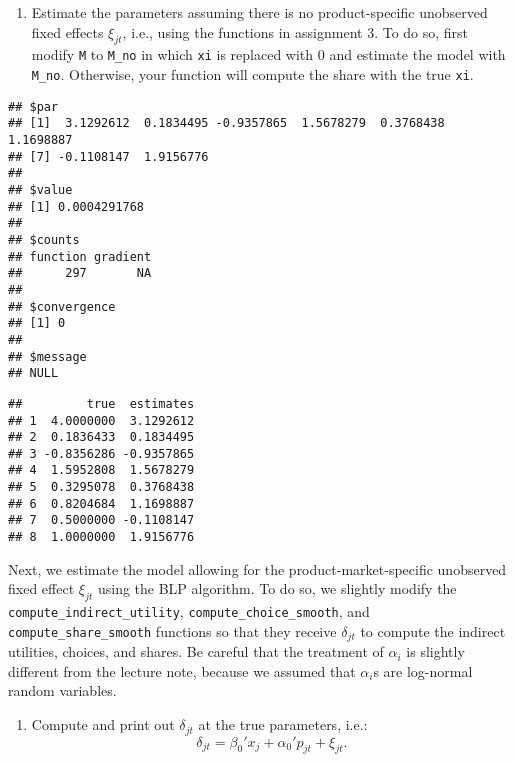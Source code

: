 \documentclass[
]{book}
\newenvironment{Shaded}{\begin{snugshade}}{\end{snugshade}}
\newcommand{\DataTypeTok}[1]{\textcolor[rgb]{0.13,0.29,0.53}{#1}}
\newcommand{\DecValTok}[1]{\textcolor[rgb]{0.00,0.00,0.81}{#1}}
\newcommand{\KeywordTok}[1]{\textcolor[rgb]{0.13,0.29,0.53}{\textbf{#1}}}
\newcommand{\NormalTok}[1]{#1}
\newcommand{\OperatorTok}[1]{\textcolor[rgb]{0.81,0.36,0.00}{\textbf{#1}}}
\newcommand{\StringTok}[1]{\textcolor[rgb]{0.31,0.60,0.02}{#1}}
\providecommand{\tightlist}{%
  \setlength{\itemsep}{0pt}\setlength{\parskip}{0pt}}
\begin{document}
\begin{enumerate}
\def\labelenumi{\arabic{enumi}.}
\setcounter{enumi}{2}
\tightlist
\item
  Estimate the parameters assuming there is no product-specific unobserved fixed effects \(\xi_{jt}\), i.e., using the functions in assignment 3. To do so, first modify \texttt{M} to \texttt{M\_no} in which \texttt{xi} is replaced with 0 and estimate the model with \texttt{M\_no}. Otherwise, your function will compute the share with the true \texttt{xi}.
\end{enumerate}

\begin{Shaded}
\end{Shaded}

\begin{verbatim}
## $par
## [1]  3.1292612  0.1834495 -0.9357865  1.5678279  0.3768438  1.1698887
## [7] -0.1108147  1.9156776
## 
## $value
## [1] 0.0004291768
## 
## $counts
## function gradient 
##      297       NA 
## 
## $convergence
## [1] 0
## 
## $message
## NULL
\end{verbatim}

\begin{verbatim}
##         true  estimates
## 1  4.0000000  3.1292612
## 2  0.1836433  0.1834495
## 3 -0.8356286 -0.9357865
## 4  1.5952808  1.5678279
## 5  0.3295078  0.3768438
## 6  0.8204684  1.1698887
## 7  0.5000000 -0.1108147
## 8  1.0000000  1.9156776
\end{verbatim}

Next, we estimate the model allowing for the product-market-specific unobserved fixed effect \(\xi_{jt}\) using the BLP algorithm. To do so, we slightly modify the \texttt{compute\_indirect\_utility}, \texttt{compute\_choice\_smooth}, and \texttt{compute\_share\_smooth} functions so that they receive \(\delta_{jt}\) to compute the indirect utilities, choices, and shares. Be careful that the treatment of \(\alpha_i\) is slightly different from the lecture note, because we assumed that \(\alpha_i\)s are log-normal random variables.

\begin{enumerate}
\def\labelenumi{\arabic{enumi}.}
\setcounter{enumi}{3}
\tightlist
\item
  Compute and print out \(\delta_{jt}\) at the true parameters, i.e.:
  \[
  \delta_{jt} = \beta_0' x_j + \alpha_0' p_{jt} + \xi_{jt}.
  \]
\end{enumerate}
\end{document}
